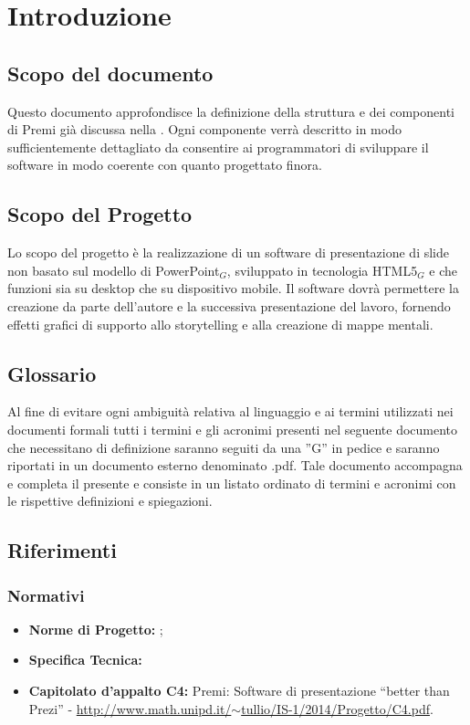 \section{Introduzione}
\subsection{Scopo del documento}
Questo documento approfondisce la definizione della struttura e dei componenti di Premi già discussa nella \ST{}. Ogni componente verrà descritto in modo sufficientemente dettagliato da consentire ai programmatori di sviluppare il software in modo coerente con
 quanto progettato finora.

\subsection{Scopo del Progetto}
Lo scopo del progetto è la realizzazione di un software di presentazione di slide non basato sul modello di PowerPoint$_{G}$, sviluppato in tecnologia HTML5$_{G}$ e che funzioni sia su desktop che su dispositivo mobile. Il software dovrà permettere la creazione da parte dell'autore e la successiva presentazione del lavoro, fornendo effetti grafici di supporto allo storytelling e alla creazione di mappe mentali. 

\subsection{Glossario}
Al fine di evitare ogni ambiguità relativa al linguaggio e ai termini utilizzati nei documenti formali tutti i termini e gli acronimi presenti nel seguente documento che necessitano di definizione saranno seguiti da una ”G” in pedice e saranno riportati in un documento esterno denominato \Glo{}.pdf. Tale documento accompagna e completa il presente e consiste in un listato ordinato di termini e acronimi con le rispettive definizioni e spiegazioni.

\subsection{Riferimenti}
\subsubsection{Normativi}
\begin{itemize}
	\item \textbf{Norme di Progetto:} \textit{\NdP};
	\item \textbf{Specifica Tecnica:} \textit{\ST}
	\item \textbf{Capitolato d'appalto C4:} Premi: Software di presentazione ``better than Prezi'' - \href{http://www.math.unipd.it/~tullio/IS-1/2014/Progetto/C4.pdf}{http://www.math.unipd.it/$\sim$tullio/IS-1/2014/Progetto/C4.pdf}.
\end{itemize}
